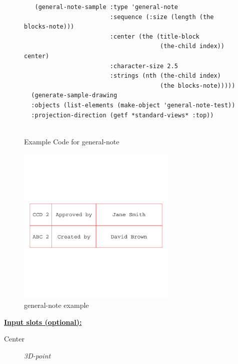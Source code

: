 \documentclass [11pt]{book}
\begin{document}
\begin{itemize}
\begin{figure}
\begin{lrbox}{\boxedverb}
\begin{minipage}{\linewidth}
{\begin{verbatim}
   (general-note-sample :type 'general-note
                        :sequence (:size (length (the blocks-note)))
                        :center (the (title-block 
                                      (the-child index)) center)
                        :character-size 2.5
                        :strings (nth (the-child index) 
                                      (the blocks-note)))))
  (generate-sample-drawing 
  :objects (list-elements (make-object 'general-note-test)) 
  :projection-direction (getf *standard-views* :top))


\end{verbatim}}
\end{minipage}
\end{lrbox}
\fbox{\usebox{\boxedverb}}

\caption{Example Code for general-note}

\label{fig:example-code-general-note}

\end{figure}

\begin{figure}
\begin{center}
\includegraphics[width=3in,height=3in]{../images/example-general-note.pdf}
\end{center}

\caption{general-note example}

\label{fig:general-note}

\end{figure}





\textbf{
\underline{Input slots (optional):}}

\begin{description}

\item [Center]
\emph{3D-point}


\end{description}
\end{itemize}
\end{document}
